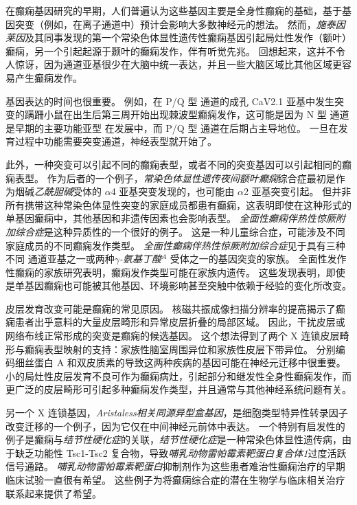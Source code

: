 在癫痫基因研究的早期，人们普遍认为这些基因主要是全身性癫痫的基础，基于基因突变（例如，在离子通道中）预计会影响大多数神经元的想法。
然而，\textit{施泰因莱因}及其同事发现的第一个常染色体显性遗传性癫痫基因引起局灶性发作（额叶）癫痫，另一个引起起源于颞叶的癫痫发作，伴有听觉先兆。
回想起来，这并不令人惊讶，因为通道亚基很少在大脑中统一表达，并且一些大脑区域比其他区域更容易产生癫痫发作。


基因表达的时间也很重要。
例如，在 P/Q 型  通道的成孔 CaV2.1 亚基中发生突变的蹒跚小鼠在出生后第三周开始出现棘波型癫痫发作，这可能是因为 N 型  通道是早期的主要功能亚型 在发展中，而 P/Q 型  通道在后期占主导地位。
一旦在发育过程中功能需要突变通道，神经表型就开始了。


此外，一种突变可以引起不同的癫痫表型，或者不同的突变基因可以引起相同的癫痫表型。
作为后者的一个例子，\textit{常染色体显性遗传夜间额叶癫痫}综合症最初是作为烟碱\textit{乙酰胆碱}受体的 $\alpha$4 亚基突变发现的，也可能由 $\alpha$2 亚基突变引起。
但并非所有携带这种常染色体显性突变的家庭成员都患有癫痫，这表明即使在这种形式的单基因癫痫中，其他基因和非遗传因素也会影响表型。
\textit{全面性癫痫伴热性惊厥附加综合症}是这种异质性的一个很好的例子。 这是一种儿童综合症，可能涉及不同家庭成员的不同癫痫发作类型。
\textit{全面性癫痫伴热性惊厥附加综合症}见于具有三种不同  通道亚基之一或两种\textit{$\gamma$-氨基丁酸}$^A$ 受体之一的基因突变的家族。
全面性发作性癫痫的家族研究表明，癫痫发作类型可能在家族内遗传。
这些发现表明，即使是单基因癫痫也可能被其他基因、环境影响甚至突触中依赖于经验的变化所改变。


皮层发育改变可能是癫痫的常见原因。
核磁共振成像扫描分辨率的提高揭示了癫痫患者出乎意料的大量皮层畸形和异常皮层折叠的局部区域。
因此，干扰皮层或网络布线正常形成的突变是癫痫的候选基因。
这个想法得到了两个 X 连锁皮层畸形与癫痫表型映射的支持：家族性脑室周围异位和家族性皮层下带异位。
分别编码细丝蛋白 A 和双皮质素的导致这两种疾病的基因可能在神经元迁移中很重要。
小的局灶性皮层发育不良可作为癫痫病灶，引起部分和继发性全身性癫痫发作，而更广泛的皮层畸形可引起多种癫痫发作类型，并且通常与其他神经系统问题有关。


另一个 X 连锁基因，\textit{Aristaless相关同源异型盒基因}，是细胞类型特异性转录因子改变迁移的一个例子，因为它仅在中间神经元前体中表达。
一个特别有启发性的例子是癫痫与\textit{结节性硬化症}的关联，\textit{结节性硬化症}是一种常染色体显性遗传病，由于缺乏功能性 Tsc1-Tsc2 复合物，导致\textit{哺乳动物雷帕霉素靶蛋白复合体1}过度活跃信号通路。
\textit{哺乳动物雷帕霉素靶蛋白}抑制剂作为这些患者难治性癫痫治疗的早期临床试验一直很有希望。
这些例子为将癫痫综合症的潜在生物学与临床相关治疗联系起来提供了希望。


